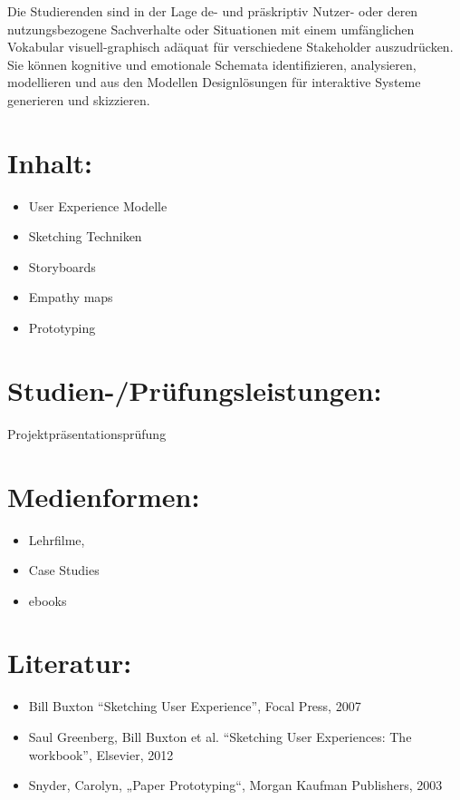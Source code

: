 Die Studierenden sind in der Lage de- und präskriptiv Nutzer- oder deren
nutzungsbezogene Sachverhalte oder Situationen mit einem umfänglichen
Vokabular visuell-graphisch adäquat für verschiedene Stakeholder
auszudrücken. Sie können kognitive und emotionale Schemata
identifizieren, analysieren, modellieren und aus den Modellen
Designlösungen für interaktive Systeme generieren und skizzieren.

\section*{Inhalt:}\label{inhalt-7}

\begin{itemize}
\tightlist
\item
  User Experience Modelle
\item
  Sketching Techniken
\item
  Storyboards
\item
  Empathy maps
\item
  Prototyping
\end{itemize}

\section*{Studien-/Prüfungsleistungen:}\label{studien-pruxfcfungsleistungen-7}

Projektpräsentationsprüfung

\section*{Medienformen:}\label{medienformen-7}

\begin{itemize}
\tightlist
\item
  Lehrfilme,
\item
  Case Studies
\item
  ebooks
\end{itemize}

\section*{Literatur:}\label{literatur-7}

\begin{itemize}
\tightlist
\item
  Bill Buxton ``Sketching User Experience'', Focal Press, 2007
\item
  Saul Greenberg, Bill Buxton et al. ``Sketching User Experiences: The
  workbook'', Elsevier, 2012
\item
  Snyder, Carolyn, „Paper Prototyping``, Morgan Kaufman Publishers, 2003
\end{itemize}

